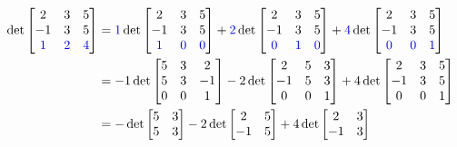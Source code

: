 \begin{observation}
  \begin{align*}
\det \begin{bmatrix} 2 & 3 & 5  \\ -1 & 3 & 5 \\ \textcolor{blue}{1} & \textcolor{blue}{2} & \textcolor{blue}{4} \end{bmatrix} &=
\textcolor{blue}{1}\det \begin{bmatrix} 2 & 3 & 5  \\ -1 & 3 & 5 \\ \textcolor{blue}{1} & \textcolor{blue}{0} & \textcolor{blue}{0} \end{bmatrix} +
\textcolor{blue}{2}\det \begin{bmatrix} 2 & 3 & 5  \\ -1 & 3 & 5 \\ \textcolor{blue}{0} & \textcolor{blue}{1} & \textcolor{blue}{0} \end{bmatrix} +
\textcolor{blue}{4}\det \begin{bmatrix} 2 & 3 & 5  \\ -1 & 3 & 5 \\ \textcolor{blue}{0} & \textcolor{blue}{0} & \textcolor{blue}{1} \end{bmatrix} \\
&= -1\det \begin{bmatrix}  5 & 3 & 2 \\ 5 & 3 & -1 \\ 0 & 0 & 1 \end{bmatrix} 
-2\det \begin{bmatrix} 2 & 5 & 3  \\ -1 & 5 & 3 \\ 0 & 0 & 1 \end{bmatrix} +
4\det \begin{bmatrix} 2 & 3 & 5  \\ -1 & 3 & 5 \\ 0 & 0 & 1 \end{bmatrix} \\
&= -\det \begin{bmatrix} 5 & 3 \\ 5 & 3 \end{bmatrix} 
-2 \det \begin{bmatrix} 2 & 5 \\ -1 & 5 \end{bmatrix}
+4 \det \begin{bmatrix} 2 & 3 \\ -1 & 3 \end{bmatrix}
\end{align*}

\end{observation}

